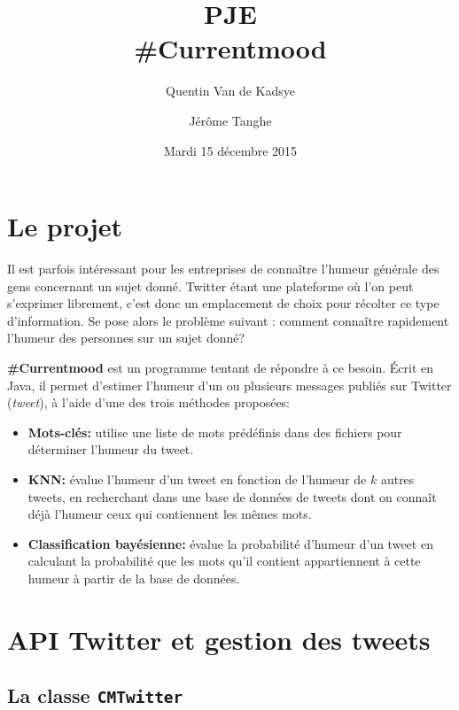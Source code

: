 \documentclass[12pt,a4paper]{report}
\title{PJE\\\#Currentmood}
\author{Quentin Van de Kadsye \and Jérôme Tanghe}
\date{Mardi 15 décembre 2015}
\begin{document}
\maketitle

\tableofcontents


\chapter{Le projet}

Il est parfois intéressant pour les entreprises de connaître l'humeur générale
des gens concernant un sujet donné. Twitter étant une plateforme où l'on peut
s'exprimer librement, c'est donc un emplacement de choix pour récolter ce type
d'information. Se pose alors le problème suivant : comment connaître rapidement
l'humeur des personnes sur un sujet donné?

\textbf{\#Currentmood} est un programme tentant de répondre à ce besoin. Écrit
en Java, il permet d'estimer l'humeur d'un ou plusieurs messages publiés sur
Twitter (\textit{tweet}), à l'aide d'une des trois méthodes proposées:

\begin{itemize}
    \item
        \textbf{Mots-clés:} utilise une liste de mots prédéfinis dans des
        fichiers pour déterminer l'humeur du tweet.
    \item
        \textbf{KNN:} évalue l'humeur d'un tweet en fonction de l'humeur de $k$
        autres tweets, en recherchant dans une base de données de tweets dont on
        connaît déjà l'humeur ceux qui contiennent les mêmes mots.
    \item
        \textbf{Classification bayésienne:} évalue la probabilité d'humeur d'un
        tweet en calculant la probabilité que les mots qu'il contient
        appartiennent à cette humeur à partir de la base de données.
\end{itemize}



\chapter{API Twitter et gestion des tweets}

\section{La classe \texttt{CMTwitter}}
\end{document}
